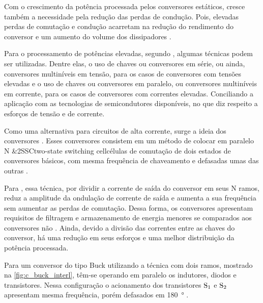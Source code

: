             Com o crescimento da potência processada pelos conversores estáticos, cresce também a necessidade pela redução das perdas de condução. Pois, elevadas perdas de comutação e condução acarretam na redução do rendimento do conversor e um aumento do volume dos dissipadores \cite{ref:BI_phd_Peraca}.
            
            Para o processamento de potências elevadas, segundo , algumas técnicas podem ser utilizadas. Dentre elas, o uso de chaves ou conversores em série, ou ainda, conversores multiníveis em tensão, para os casos de conversores com tensões elevadas e o uso de chaves ou conversores em paralelo, ou conversores multiníveis em corrente, para os casos de conversores com correntes elevadas. Conciliando a aplicação com as tecnologias de semicondutores disponíveis, no que diz respeito a esforços de tensão e de corrente.
            
            Como uma alternativa para circuitos de alta corrente, surge a ideia dos conversores \interleaved. Esses conversores consistem em um método de colocar em paralelo N \abreviatura&{2SSC}{two-state switching cell}{células de comutação de dois estados} de conversores básicos, com mesma frequência de chaveamento e defasadas umas das outras \cite{ref:BI_artigo_DesignSimul}. 
            
            Para , essa técnica, por dividir a corrente de saída do conversor em seus N ramos, reduz a amplitude da ondulação de corrente de saída e aumenta a sua frequência sem aumentar as perdas de comutação. Dessa forma, os conversores \interleaved apresentam requisitos de filtragem e armazenamento de energia menores se comparados aos conversores não \interleaved. Ainda, devido a divisão das correntes entre as chaves do conversor, há uma redução em seus esforços e uma melhor distribuição da potência processada. 
            
            Para um conversor do tipo Buck utilizando a técnica \interleaving com dois ramos, mostrado na \autoref{fig:c_buck_interl}, têm-se operando em paralelo os indutores, diodos e transistores. Nessa configuração o acionamento dos transistores $\text{S}_\text{1}$ e $\text{S}_\text{2}$ apresentam mesma frequência, porém defasados em \qty{180}{\degree} \cite{ref:BI_artigo_DesignSimul}.
            
